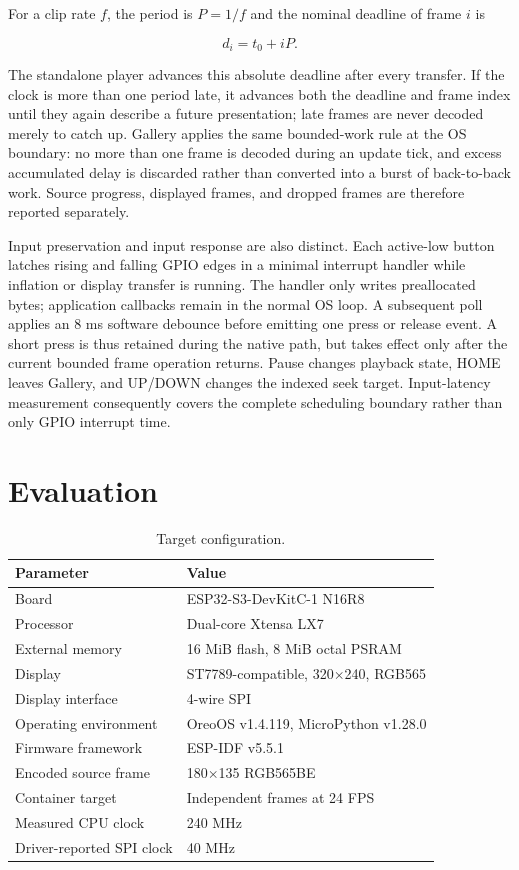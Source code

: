 \documentclass[11pt,twocolumn]{article}
\begin{document}
For a clip rate $f$, the period is $P=1/f$ and the nominal deadline of frame
$i$ is

\begin{equation}
d_i=t_0+iP.
\end{equation}

The standalone player advances this absolute deadline after every transfer.
If the clock is more than one period late, it advances both the deadline and
frame index until they again describe a future presentation; late frames are
never decoded merely to catch up.  Gallery applies the same bounded-work rule
at the OS boundary: no more than one frame is decoded during an update tick,
and excess accumulated delay is discarded rather than converted into a burst
of back-to-back work.  Source progress, displayed frames, and dropped frames
are therefore reported separately.

Input preservation and input response are also distinct.  Each active-low
button latches rising and falling GPIO edges in a minimal interrupt handler
while inflation or display transfer is running.  The handler only writes
preallocated bytes; application callbacks remain in the normal OS loop.  A
subsequent poll applies an 8 ms software debounce before emitting one press or
release event.  A short press is thus retained during the native path, but
takes effect only after the current bounded frame operation returns.  Pause
changes playback state, HOME leaves Gallery, and UP/DOWN changes the indexed
seek target.  Input-latency measurement consequently covers the complete
scheduling boundary rather than only GPIO interrupt time.

\section{Evaluation}

\begin{table}[t]
\centering
\caption{Target configuration.}
\label{tab:platform}
\begin{tabular}{@{}p{}p{}@{}}
\toprule
Parameter & Value \\
\midrule
Board & ESP32-S3-DevKitC-1 N16R8 \\
Processor & Dual-core Xtensa LX7 \\
External memory & 16 MiB flash, 8 MiB octal PSRAM \\
Display & ST7789-compatible, 320$\times$240, RGB565 \\
Display interface & 4-wire SPI \\
Operating environment & OreoOS v1.4.119, MicroPython v1.28.0 \\
Firmware framework & ESP-IDF v5.5.1 \\
Encoded source frame & 180$\times$135 RGB565BE \\
Container target & Independent frames at 24 FPS \\
Measured CPU clock & 240 MHz \\
Driver-reported SPI clock & 40 MHz \\
\bottomrule
\end{tabular}
\end{table}
\end{document}
